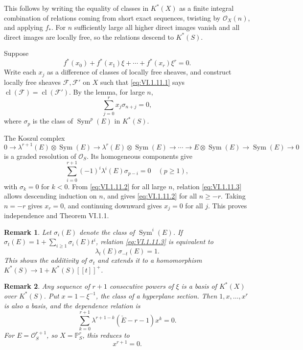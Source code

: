 \documentclass[13pt]{extarticle}
\newcommand{\cO}{\mathcal O}
\newcommand{\Sym}{\operatorname{Sym}}
\newcommand{\cl}{\operatorname{cl}}
\newtheorem*{remark}{Remark}
\begin{document}
This follows by writing the equality of classes in $K^*(X)$ as a finite integral combination of relations coming from short exact sequences, twisting by $\cO_X(n)$, and applying $f_*$. For $n$ sufficiently large all higher direct images vanish and all direct images are locally free, so the relations descend to $K^*(S)$.

Suppose
\begin{equation}\label{eq:VI.1.11.1}
f^*(x_0)+f^*(x_1)\xi+\cdots+f^*(x_r)\xi^r=0.
\end{equation}
Write each $x_j$ as a difference of classes of locally free sheaves, and construct locally free sheaves $\mathcal F,\mathcal F'$ on $X$ such that \eqref{eq:VI.1.11.1} says $\cl(\mathcal F)=\cl(\mathcal F')$. By the lemma, for large $n$,
\begin{equation}\label{eq:VI.1.11.2}
\sum_{j=0}^{r}x_j\sigma_{n+j}=0,
\end{equation}
where $\sigma_p$ is the class of $\Sym^p(E)$ in $K^*(S)$.

The Koszul complex
\[
0\to \lambda^{r+1}(E)\otimes\Sym(E)\to\lambda^r(E)\otimes\Sym(E)\to\cdots\to E\otimes\Sym(E)\to\Sym(E)\to 0
\]
is a graded resolution of $\cO_S$. Its homogeneous components give
\begin{equation}\label{eq:VI.1.11.3}
\sum_{i=0}^{r+1}(-1)^i\lambda^i(E)\sigma_{p-i}=0\quad(p\geq 1),
\end{equation}
with $\sigma_k=0$ for $k<0$. From \eqref{eq:VI.1.11.2} for all large $n$, relation \eqref{eq:VI.1.11.3} allows descending induction on $n$, and gives \eqref{eq:VI.1.11.2} for all $n\geq -r$. Taking $n=-r$ gives $x_r=0$, and continuing downward gives $x_j=0$ for all $j$. This proves independence and Theorem VI.1.1.

\begin{remark}
Let $\sigma_i(E)$ denote the class of $\Sym^i(E)$. If $\sigma_t(E)=1+\sum_{i\geq 1}\sigma_i(E)t^i$, relation \eqref{eq:VI.1.11.3} is equivalent to
\begin{equation}\label{eq:VI.1.12.1}
\lambda_t(E)\sigma_{-t}(E)=1.
\end{equation}
This shows the additivity of $\sigma_t$ and extends it to a homomorphism $K^*(S)\to 1+K^*(S)[[t]]^+$.
\end{remark}

\begin{remark}
Any sequence of $r+1$ consecutive powers of $\xi$ is a basis of $K^*(X)$ over $K^*(S)$. Put $x=1-\xi^{-1}$, the class of a hyperplane section. Then $1,x,\ldots,x^r$ is also a basis, and the dependence relation is
\begin{equation}\label{eq:VI.1.13.1}
\sum_{k=0}^{r+1}\lambda^{r+1-k}(\check E-r-1)x^k=0.
\end{equation}
For $E=\cO_S^{r+1}$, so $X=\mathbb P^r_S$, this reduces to
\begin{equation}\label{eq:VI.1.13.2}
x^{r+1}=0.
\end{equation}
\end{remark}
\end{document}
